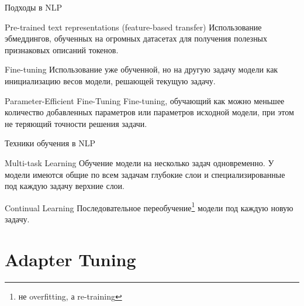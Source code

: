\documentclass[9pt]{beamer}
\begin{document}
\begin{frame}{Подходы в NLP}

    \begin{block}{Pre-trained text representations (feature-based transfer)}
        Использование эбмеддингов, обученных на огромных датасетах для получения полезных признаковых описаний токенов.
    \end{block}

    \begin{block}{Fine-tuning}
        Использование уже обученной, но на другую задачу модели как инициализацию весов модели, решающей текущую задачу.
    \end{block}

    \begin{block}{Parameter-Efficient Fine-Tuning}
        Fine-tuning, обучающий как можно меньшее количество добавленных параметров или параметров исходной модели, при этом не теряющий точности решения задачи.
    \end{block}

\end{frame}

\begin{frame}{Техники обучения в NLP}

    \begin{block}{Multi-task Learning}
        Обучение модели на несколько задач одновременно. У модели имеются общие по всем задачам глубокие слои и специализированные под каждую задачу верхние слои.
    \end{block}

    \begin{block}{Continual Learning}
        Последовательное переобучение\footnote{не overfitting, а re-training} модели под каждую новую задачу.
    \end{block}

\end{frame}


\section{Adapter Tuning}
\end{document}
